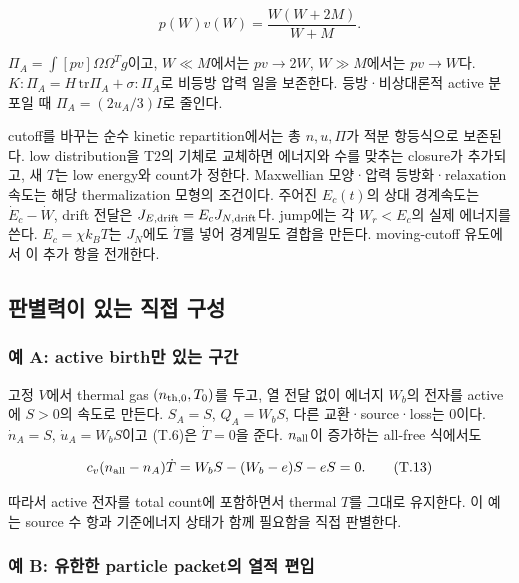 \[
p(W)v(W)=\frac{W(W+2M)}{W+M}.
\tag{T.12}
\]

\(\Pi_A=\int[pv]\Omega\Omega^Tg\)이고, \(W\ll M\)에서는 \(pv\to2W\), \(W\gg M\)에서는 \(pv\to W\)다. \(K:\Pi_A=H\,\mathrm{tr}\Pi_A+\sigma:\Pi_A\)로 비등방 압력 일을 보존한다. 등방·비상대론적 active 분포일 때 \(\Pi_A=(2u_A/3)I\)로 줄인다.

cutoff를 바꾸는 순수 kinetic repartition에서는 총 \(n,u,\Pi\)가 적분 항등식으로 보존된다. low distribution을 T2의 기체로 교체하면 에너지와 수를 맞추는 closure가 추가되고, 새 \(T\)는 low energy와 count가 정한다. Maxwellian 모양·압력 등방화·relaxation 속도는 해당 thermalization 모형의 조건이다. 주어진 \(E_c(t)\)의 상대 경계속도는 \(\dot E_c-\dot W\), drift 전달은 \(J_{E,\rm drift}=E_cJ_{N,\rm drift}\)다. jump에는 각 \(W_r<E_c\)의 실제 에너지를 쓴다. \(E_c=\chi k_BT\)는 \(J_N\)에도 \(\dot T\)를 넣어 경계밀도 결합을 만든다. moving-cutoff 유도에서 이 추가 항을 전개한다.

\hypertarget{uxd310uxbcc4uxb825uxc774-uxc788uxb294-uxc9c1uxc811-uxad6cuxc131}{%
\subsection{판별력이 있는 직접 구성}\label{uxd310uxbcc4uxb825uxc774-uxc788uxb294-uxc9c1uxc811-uxad6cuxc131}}

\hypertarget{uxc608-a-active-birthuxb9cc-uxc788uxb294-uxad6cuxac04}{%
\subsubsection{예 A: active birth만 있는 구간}\label{uxc608-a-active-birthuxb9cc-uxc788uxb294-uxad6cuxac04}}

고정 \(V\)에서 thermal gas \((n_{\rm th,0},T_0)\)를 두고, 열 전달 없이 에너지 \(W_b\)의 전자를 active에 \(S>0\)의 속도로 만든다. \(S_A=S\), \(Q_A=W_bS\), 다른 교환·source·loss는 0이다. \(\dot n_A=S\), \(\dot u_A=W_bS\)이고 (T.6)은 \(\dot T=0\)을 준다. \(n_{\rm all}\)이 증가하는 all-free 식에서도

\[
c_v(n_{\rm all}-n_A)\dot T
=W_bS-(W_b-e)S-eS=0.
\tag{T.13}
\]

따라서 active 전자를 total count에 포함하면서 thermal \(T\)를 그대로 유지한다. 이 예는 source 수 항과 기준에너지 상태가 함께 필요함을 직접 판별한다.

\hypertarget{uxc608-b-uxc720uxd55cuxd55c-particle-packetuxc758-uxc5f4uxc801-uxd3b8uxc785}{%
\subsubsection{예 B: 유한한 particle packet의 열적 편입}\label{uxc608-b-uxc720uxd55cuxd55c-particle-packetuxc758-uxc5f4uxc801-uxd3b8uxc785}}

